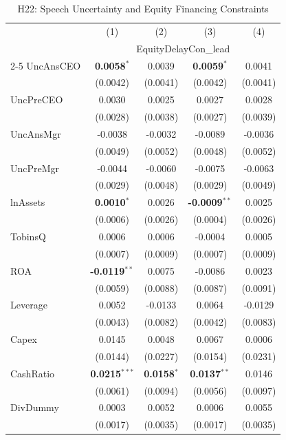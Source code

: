 \begin{landscape}
\begin{table}[H]
\setlength{\tabcolsep}{3pt}
\renewcommand{\arraystretch}{0.85}
\centering
\caption{H22: Speech Uncertainty and Equity Financing Constraints}
\label{tab:h22}
\scriptsize
\begin{tabular}{lcccc}
\toprule
 & (1) & (2) & (3) & (4) \\
 & \multicolumn{4}{c}{EquityDelayCon\_lead} \\
\cmidrule(lr){2-5}
\midrule
UncAnsCEO & \textbf{0.0058}$^{*}$ & 0.0039 & \textbf{0.0059}$^{*}$ & 0.0041 \\
 & (0.0042) & (0.0041) & (0.0042) & (0.0041) \\
UncPreCEO & 0.0030 & 0.0025 & 0.0027 & 0.0028 \\
 & (0.0028) & (0.0038) & (0.0027) & (0.0039) \\
UncAnsMgr & -0.0038 & -0.0032 & -0.0089 & -0.0036 \\
 & (0.0049) & (0.0052) & (0.0048) & (0.0052) \\
UncPreMgr & -0.0044 & -0.0060 & -0.0075 & -0.0063 \\
 & (0.0029) & (0.0048) & (0.0029) & (0.0049) \\
\midrule
lnAssets & \textbf{0.0010}$^{*}$ & 0.0026 & \textbf{-0.0009}$^{**}$ & 0.0025 \\
 & (0.0006) & (0.0026) & (0.0004) & (0.0026) \\
TobinsQ & 0.0006 & 0.0006 & -0.0004 & 0.0005 \\
 & (0.0007) & (0.0009) & (0.0007) & (0.0009) \\
ROA & \textbf{-0.0119}$^{**}$ & 0.0075 & -0.0086 & 0.0023 \\
 & (0.0059) & (0.0088) & (0.0087) & (0.0091) \\
Leverage & 0.0052 & -0.0133 & 0.0064 & -0.0129 \\
 & (0.0043) & (0.0082) & (0.0042) & (0.0083) \\
Capex & 0.0145 & 0.0048 & 0.0067 & 0.0006 \\
 & (0.0144) & (0.0227) & (0.0154) & (0.0231) \\
CashRatio & \textbf{0.0215}$^{***}$ & \textbf{0.0158}$^{*}$ & \textbf{0.0137}$^{**}$ & 0.0146 \\
 & (0.0061) & (0.0094) & (0.0056) & (0.0097) \\
DivDummy & 0.0003 & 0.0052 & 0.0006 & 0.0055 \\
 & (0.0017) & (0.0035) & (0.0017) & (0.0035) \\

\end{tabular}
\end{table}
\end{landscape}
